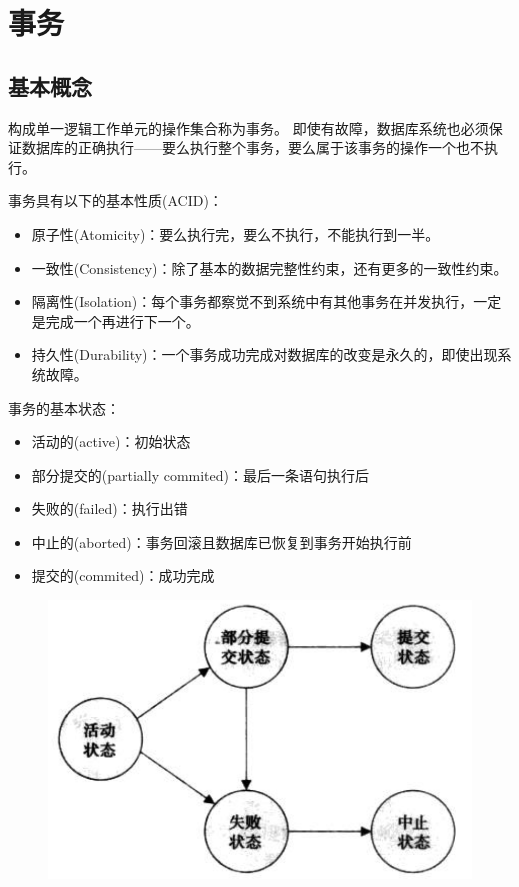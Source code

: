 
\section{事务} %
\subsection{基本概念}
\begin{definition}[事务(transaction)]
构成单一逻辑工作单元的操作集合称为事务。
即使有故障，数据库系统也必须保证数据库的正确执行——要么执行整个事务，要么属于该事务的操作一个也不执行。
\end{definition}

事务具有以下的基本性质(ACID)：
\begin{itemize}
	\item 原子性(Atomicity)：要么执行完，要么不执行，不能执行到一半。
	\item 一致性(Consistency)：除了基本的数据完整性约束，还有更多的一致性约束。
	\item 隔离性(Isolation)：每个事务都察觉不到系统中有其他事务在并发执行，一定是完成一个再进行下一个。
	\item 持久性(Durability)：一个事务成功完成对数据库的改变是永久的，即使出现系统故障。
\end{itemize}

事务的基本状态：
\begin{itemize}
	\item 活动的(active)：初始状态
	\item 部分提交的(partially commited)：最后一条语句执行后
	\item 失败的(failed)：执行出错
	\item 中止的(aborted)：事务回滚且数据库已恢复到事务开始执行前
	\item 提交的(commited)：成功完成
\end{itemize}
\begin{figure}[H]
\centering
\includegraphics[width=0.3\linewidth]{fig/transaction_state.png}
\end{figure}

